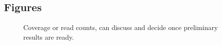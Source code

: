 \documentclass{bmcart}
\begin{document}
\begin{backmatter}



\section*{Figures}
\begin{figure}[h!]
\caption{ Coverage or read counts, can discuss and decide once preliminary results are ready.}
\label{fCoverage}
\end{figure}
%



\end{backmatter}
\end{document}
